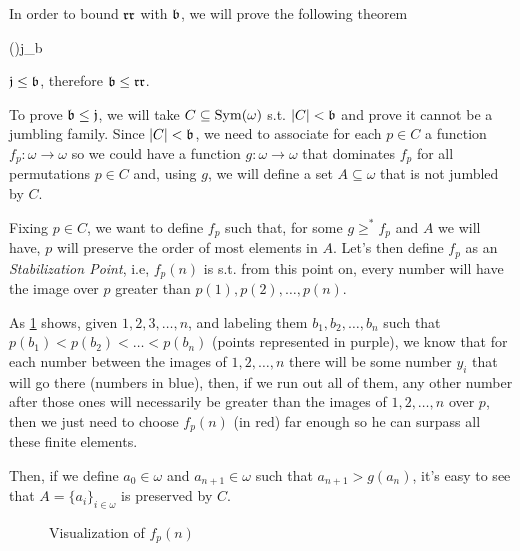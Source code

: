 In order to bound $\mathfrak{rr}$ with $\mathfrak{b}$, we will prove the following theorem

\begin{theorem}{(\cite{blass})}{j_b}
    \begin{center}
        $\mathfrak{j}\leq\mathfrak{b}$, therefore $\mathfrak{b}\leq\mathfrak{rr}$.
    \end{center}
\end{theorem}

\begin{sketch}
    To prove $\mathfrak{b}\leq\mathfrak{j}$, we will take $C\subseteq\mathrm{Sym}(\omega)$ s.t. $\lvert C\rvert<\mathfrak{b}$ and prove it cannot be a jumbling family. Since $\lvert C\rvert<\mathfrak{b}$, we need to associate for each $p\in C$ a function $f_p:\omega\to\omega$ so we could have a function $g:\omega\to\omega$ that dominates $f_p$ for all permutations $p\in C$ and, using $g$, we will define a set $A\subseteq\omega$ that is not jumbled by $C$.

    Fixing $p\in C$, we want to define $f_p$ such that, for some $g\geq^* f_p$ and $A$ we will have, $p$ will preserve the order of most elements in $A$. Let's then define $f_p$ as an \textit{Stabilization Point}, i.e, $f_p(n)$ is s.t. from this point on, every number will have the image over $p$ greater than $p(1),p(2),\dots,p(n)$.

    As \ref{fig:p_arrows} shows, given $1,2,3,\dots,n$, and labeling them $b_1,b_2,\dots,b_n$ such that $p(b_1)<p(b_2)<\dots<p(b_n)$ (points represented in purple), we know that for each number between the images of $1,2,\dots,n$ there will be some number $y_i$ that will go there (numbers in blue), then, if we run out all of them, any other number after those ones will necessarily be greater than the images of $1,2,\dots,n$ over $p$, then we just need to choose $f_p(n)$ (in red) far enough so he can surpass all these finite elements.

    Then, if we define $a_0\in\omega$ and $a_{n+1}\in\omega$ such that $a_{n+1}>g(a_n)$, it's easy to see that $A=\{a_i\}_{i\in\omega}$ is preserved by $C$.
\end{sketch}


\begin{figure}[ht]
    \centering
    
    \caption{Visualization of $f_p(n)$}
    \label{fig:p_arrows}
\end{figure}

